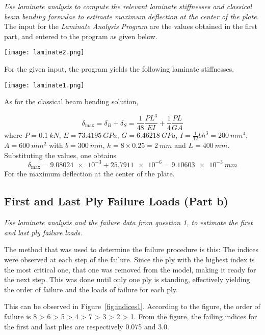 \documentclass[a4paper,twosided,11pt,DIV14]{scrartcl}
\begin{document}
\textit{Use laminate analysis to compute the relevant laminate stiffnesses and classical
beam bending formulae to estimate maximum deflection at the center of the
plate.}
%
\\The input for the \emph{Laminate Analysis Program} are the values obtained in
the first part, and entered to the program as given below.
%
\begin{center}
  \texttt{[image: laminate2.png]}
\end{center}
%
For the given input, the program yields the following laminate stiffnesses.
%
\begin{center}
  \texttt{[image: laminate1.png]}
\end{center}
%
As for the classical beam bending solution,

\begin{equation}
  \delta_{\max} = \delta_B + \delta_S = \frac{1}{48}\frac{PL^3}{EI} + \frac{1}{4} \frac{PL}{GA}
\end{equation}
%
where $P=\SI{0.1}{kN}$, $E = \SI{73.4195}{GPa}$, $G=\SI{6.46218}{GPa}$,
$I = \frac{1}{12} b h^3 = \SI{200}{mm^4}$, $A=\SI{600}{mm^2}$ with $b =
\SI{300}{mm}$, $h = 8 \times 0.25 = \SI{2}{mm}$ and $L=\SI{400}{mm}$.
%
\\Substituting the values, one obtains
%
\begin{equation}
  \delta_{\max} = \num{9.08024e-3} + \num{25.7911e-6} = \SI{9.10603e-3}{mm}
\end{equation}
%
For the maximum deflection at the center of the plate.

\subsection{First and Last Ply Failure Loads (Part b)}

\textit{Use laminate analysis and the failure data from question 1, to estimate the
first and last ply failure loads.}

The method that was used to determine the failure procedure is this: The indices
were observed at each step of the failure. Since the ply with the highest
index is the most critical one, that one was removed from the model, making it
ready for the next step. This was done until only one ply is standing,
effectively yielding the order of failure and the loads of failure for each
ply.

This can be observed in Figure~\ref{fig:indices1}. According to the figure, the
order of failure is 8 > 6 > 5 > 4 > 7 > 3 > 2 > 1. From the figure, the failing
indices for the first and last plies are respectively 0.075 and 3.0.
\end{document}
